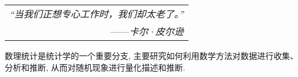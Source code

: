 \begin{flushright}
    \begin{tabular}{r|||}
        \textit{“当我们正想专心工作时，我们却太老了。”}\\
        ——\textit{卡尔·皮尔逊}
    \end{tabular}
\end{flushright}

数理统计是统计学的一个重要分支, 主要研究如何利用数学方法对数据进行收集、分析和推断, 从而对随机现象进行量化描述和推断.